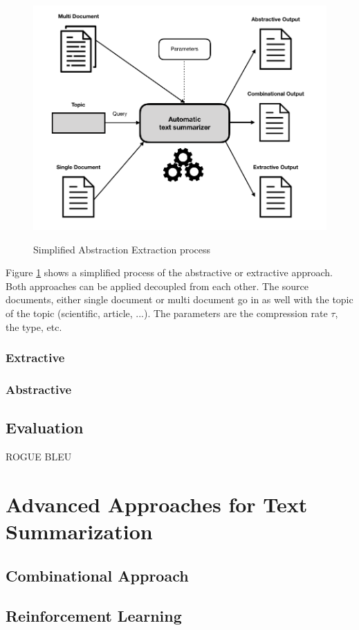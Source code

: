 \begin{figure}
	\begin{center}
		\includegraphics[width=5in]{photos/abex}\\
		\caption{Simplified Abstraction Extraction process}\label{abex}
	\end{center}
\end{figure}	

Figure \ref{abex} shows a simplified process of the abstractive or extractive approach. Both approaches can be applied decoupled from each other. The source documents, either single document or multi document go in as well with the topic of the topic (scientific, article, ...). The parameters are the compression rate \(\tau\), the type, etc. 

\subsubsection{Extractive}
\subsubsection{Abstractive}

\subsection{Evaluation}\label{ss:ev}
ROGUE
BLEU


\section{Advanced Approaches for Text Summarization}\label{ss:trends}

\subsection{Combinational Approach}

\subsection{Reinforcement Learning}
